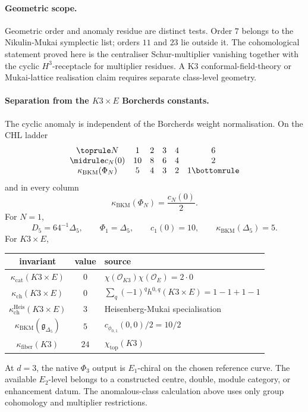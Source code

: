 \paragraph{Geometric scope.}
Geometric order and anomaly residue are distinct tests.  Order \(7\)
belongs to the Nikulin-Mukai symplectic list; orders \(11\) and \(23\)
lie outside it.  The cohomological statement proved here is the
centraliser Schur-multiplier vanishing together with the cyclic
\(H^3\)-receptacle for multiplier residues.
A K3 conformal-field-theory or Mukai-lattice realisation claim requires
separate class-level geometry.

\paragraph{Separation from the \(K3\times E\) Borcherds constants.}
The cyclic anomaly is independent of the Borcherds weight normalisation.
On the CHL ladder
\[
\begin{array}{cccccc}
\toprule
N & 1 & 2 & 3 & 4 & 6\\
\midrule
c_N(0) & 10 & 8 & 6 & 4 & 2\\
\kappa_{\mathrm{BKM}}(\Phi_N) & 5 & 4 & 3 & 2 & 1
\bottomrule
\end{array}
\]
and in every column
\[
\kappa_{\mathrm{BKM}}(\Phi_N)=\frac{c_N(0)}{2}.
\]
For \(N=1\),
\[
D_5=64^{-1}\Delta_5,\qquad
\Phi_1=\Delta_5,\qquad
c_1(0)=10,\qquad
\kappa_{\mathrm{BKM}}(\Delta_5)=5.
\]
For \(K3\times E\),
\begin{center}
\begin{tabular}{ccl}
\toprule
invariant & value & source\\
\midrule
\(\kappa_{\mathrm{cat}}(K3\times E)\) & \(0\) &
\(\chi(\mathcal O_{K3})\chi(\mathcal O_E)=2\cdot 0\)\\
\(\kappa_{\mathrm{ch}}(K3\times E)\) & \(0\) &
\(\sum_q{(-1)}^q h^{0,q}(K3\times E)=1-1+1-1\)\\
\(\kappa_{\mathrm{ch}}^{\mathrm{Heis}}(K3\times E)\) & \(3\) &
Heisenberg-Mukai specialisation\\
\(\kappa_{\mathrm{BKM}}(\mathfrak g_{\Delta_5})\) & \(5\) &
\(c_{\phi_{0,1}}(0,0)/2=10/2\)\\
\(\kappa_{\mathrm{fiber}}(K3)\) & \(24\) &
\(\chi_{\mathrm{top}}(K3)\)\\
\bottomrule
\end{tabular}
\end{center}
At \(d=3\), the native \(\Phi_3\) output is \(E_1\)-chiral on the chosen
reference curve.  The available \(E_2\)-level belongs to a constructed
centre, double, module category, or enhancement datum.  The
anomalous-class calculation above uses only group cohomology and
multiplier restrictions.


